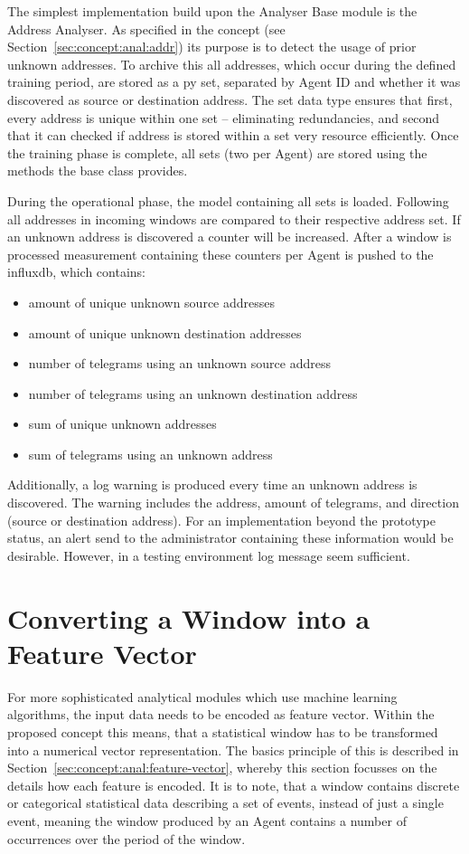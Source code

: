 The simplest implementation build upon the Analyser Base module is the Address Analyser.
As specified in the concept (see Section~\ref{sec:concept:anal:addr}) its purpose is to detect the usage of prior unknown addresses.
To archive this all addresses, which occur during the defined training period, are stored as a \gls{py} set, separated by Agent ID and whether it was discovered as source or destination address. 
The set data type ensures that first, every address is unique within one set -- eliminating redundancies, and second that it can checked if address is stored within a set very resource efficiently.
Once the training phase is complete, all sets (two per Agent) are stored using the methods the base class provides.

During the operational phase, the model containing all sets is loaded. Following all addresses in incoming windows are compared to their respective address set.
If an unknown address is discovered a counter will be increased. After a window is processed measurement containing these counters per Agent is pushed to the \gls{influxdb}, which contains:
\begin{itemize}
	\item amount of unique unknown source addresses
	\item amount of unique unknown destination addresses
	\item number of telegrams using an unknown source address
	\item number of telegrams using an unknown destination address
	\item sum of unique unknown addresses
	\item sum of telegrams using an unknown address
\end{itemize}

Additionally, a log warning is produced every time an unknown address is discovered. The warning includes the address, amount of telegrams, and direction (source or destination address).
For an implementation beyond the prototype status, an alert send to the administrator containing these information would be desirable.
However, in a testing environment log message seem sufficient.

\section{Converting a Window into a Feature Vector}
\label{sec:impl:vectoriser}

For more sophisticated analytical modules which use machine learning algorithms, the input data needs to be encoded as feature vector.
Within the proposed concept this means, that a statistical window has to be transformed into a numerical vector representation.
The basics principle of this is described in Section~\ref{sec:concept:anal:feature-vector}, whereby this section focusses on the details how each feature is encoded.
It is to note, that a window contains discrete or categorical statistical data describing a set of events, instead of just a single event, meaning the window produced by an Agent contains a number of occurrences over the period of the window.

